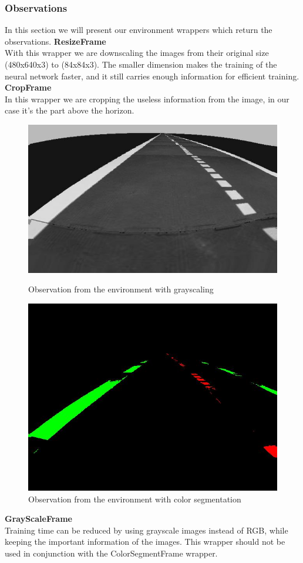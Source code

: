 \documentclass{article}
\begin{document}
\subsubsection{\normalsize{Observations}}
In this section we will present our environment wrappers which return the observations.
\textbullet  \textbf{ResizeFrame}\\
With this wrapper we are downscaling the images from their original size (480x640x3) to (84x84x3). The smaller dimension makes the training of the neural network faster, and it still carries enough information for efficient training.\\
\textbullet  \textbf{CropFrame}\\
In this wrapper we are cropping the useless information from the image, in our case it's the part above the horizon.\\
\begin{figure}[h!]
	\centering
	\begin{minipage}{.5\textwidth}
	\centering
	\includegraphics[width=0.8\linewidth]{grayscale.jpg}
	\caption{Observation from the environment with grayscaling}
	\end{minipage}%
\begin{minipage}{.5\textwidth}
	\centering
	\includegraphics[width=0.8\linewidth]{colorseg.jpg}
	\caption{Observation from the environment with color segmentation}
\end{minipage}
\end{figure}
\textbullet  \textbf{GrayScaleFrame}\\
Training time can be reduced by using grayscale images instead of RGB, while keeping the important information of the images. This wrapper should not be used in conjunction with the ColorSegmentFrame wrapper.\\
\end{document}

